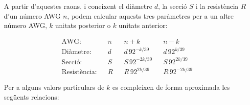 A partir d'aquestes raons, i coneixent el diàmetre $d$, la secció $S$ i la resistència $R$ d'un número AWG $n$, podem calcular aquests tres paràmetres per a un altre número AWG, $k$ unitats posterior o $k$ unitats anterior:

\begin{equation}
   \begin{array}{rllllll}
     \text{AWG:}         & & n & & n+k                & & n-k \\
     \text{Diàmetre:}    & & d & & d\, 92^{-k/39}  & & d\, 92^{k/39} \\
     \text{Secció:}      & & S & & S\, 92^{-2k/39} & & S\, 92^{2k/39} \\
     \text{Resistència:} & & R & & R\, 92^{2k/39}  & & R\, 92^{-2k/39}
   \end{array}
\end{equation}

Per a alguns valors particulars de $k$ es compleixen de forma aproximada les següents relacions:

